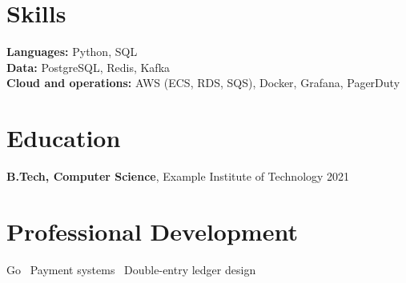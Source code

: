 \documentclass[10pt,a4paper]{article}
\begin{document}
\section{Skills}
\textbf{Languages:} Python, SQL\\
\textbf{Data:} PostgreSQL, Redis, Kafka\\
\textbf{Cloud and operations:} AWS (ECS, RDS, SQS), Docker, Grafana, PagerDuty

\section{Education}
\textbf{B.Tech, Computer Science}, Example Institute of Technology \hfill 2021

\section{Professional Development}
Go \textbar\ Payment systems \textbar\ Double-entry ledger design
\end{document}
